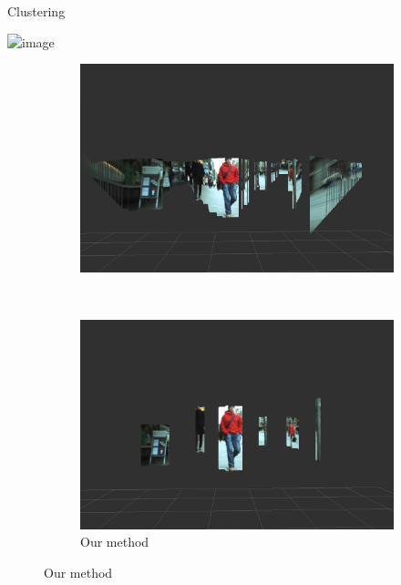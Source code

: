\begin{frame}{Clustering}
  \begin{center}
    \includegraphics<1>{detectionRate}
     {
    \begin{figure}
      \begin{subfigure}[b]{0.5\columnwidth}
	\centering
	\includegraphics[width=\textwidth]{stixelsDetection}
	\caption*{\cite{benenson2012pedestrian}}
      \end{subfigure}%
      ~
      \begin{subfigure}[b]{0.5\columnwidth}
	\centering
	\includegraphics[width=\textwidth]{obstacleDetection}
	\caption*{Our method}
      \end{subfigure}%
    \end{figure}
    }
  \end{center}
\end{frame}

